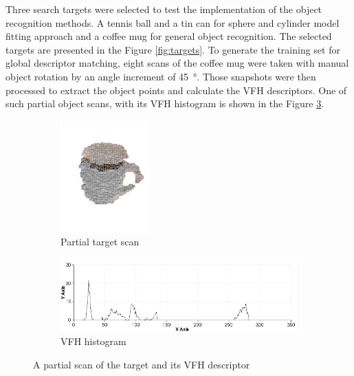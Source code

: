 Three search targets were selected to test the implementation of the object recognition methods. A tennis ball and a tin can for sphere and cylinder model fitting approach and a coffee mug for general object recognition. The selected targets are presented in the Figure \ref{fig:targets}. To generate the training set for global descriptor matching, eight scans of the coffee mug were taken with manual object rotation by an angle increment of \SI{45}{\degree}. Those snapshots were then processed to extract the object points and calculate the VFH descriptors. One of such partial object scans, with its VFH histogram is shown in the Figure \ref{fig:mugvfh}.

\begin{figure} [H]
\centering
\begin{subfigure}{.2\textwidth}
  \centering
  \includegraphics[width=.8\linewidth]{fig/mugvfh}
  \caption{Partial target scan}
  \label{fig:mugvfh1}
\end{subfigure}%
\begin{subfigure}{.7\textwidth}
  \centering
  \includegraphics[width=.8\linewidth]{fig/mug3vfh}
  \caption{VFH histogram}
  \label{fig:mugvfh2}
\end{subfigure}
\caption{A partial scan of the target and its VFH descriptor}
\label{fig:mugvfh}
\end{figure}

